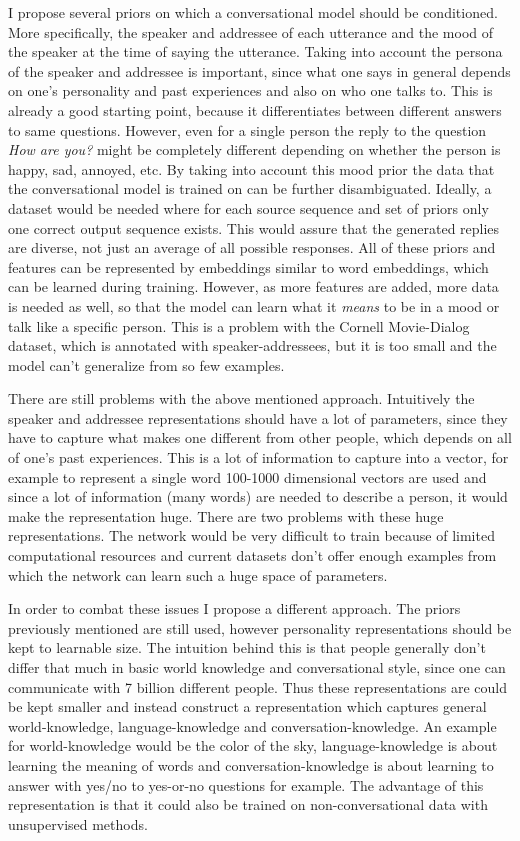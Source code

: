 \documentclass[12pt]{article}
\begin{document}
I propose several priors on which a conversational model should be conditioned. More specifically, the speaker and addressee of each utterance and the mood of the speaker at the time of saying the utterance. Taking into account the persona of the speaker and addressee is important, since what one says in general depends on one's personality and past experiences and also on who one talks to. This is already a good starting point, because it differentiates between different answers to same questions. However, even for a single person the reply to the question \textit{How are you?} might be completely different depending on whether the person is happy, sad, annoyed, etc. By taking into account this mood prior the data that the conversational model is trained on can be further disambiguated. Ideally, a dataset would be needed where for each source sequence and set of priors only one correct output sequence exists. This would assure that the generated replies are diverse, not just an average of all possible responses. All of these priors and features can be represented by embeddings similar to word embeddings, which can be learned during training. However, as more features are added, more data is needed as well, so that the model can learn what it \textit{means} to be in a mood or talk like a specific person. This is a problem with the Cornell Movie-Dialog dataset, which is annotated with speaker-addressees, but it is too small and the model can't generalize from so few examples. 

There are still problems with the above mentioned approach. Intuitively the speaker and addressee representations should have a lot of parameters, since they have to capture what makes one different from other people, which depends on all of one's past experiences. This is a lot of information to capture into a vector, for example to represent a single word 100-1000 dimensional vectors are used and since a lot of information (many words) are needed to describe a person, it would make the representation huge. There are two problems with these huge representations. The network would be very difficult to train because of limited computational resources and current datasets don't offer enough examples from which the network can learn such a huge space of parameters.

In order to combat these issues I propose a different approach. The priors previously mentioned are still used, however personality representations should be kept to learnable size. The intuition behind this is that people generally don't differ that much in basic world knowledge and conversational style, since one can communicate with 7 billion different people. Thus these representations are could be kept smaller and instead construct a representation which captures general world-knowledge, language-knowledge and conversation-knowledge. An example for world-knowledge would be the color of the sky, language-knowledge is about learning the meaning of words and conversation-knowledge is about learning to answer with yes/no to yes-or-no questions for example. The advantage of this representation is that it could also be trained on non-conversational data with unsupervised methods.
\end{document}
